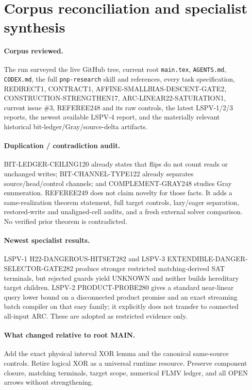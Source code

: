 \documentclass[11pt]{article}
\begin{document}
\section{Corpus reconciliation and specialist synthesis}
\paragraph{Corpus reviewed.}
The run surveyed the live GitHub tree, current root \texttt{main.tex},
\texttt{AGENTS.md}, \texttt{CODEX.md}, the full \texttt{pnp-research} skill and
references, every task specification, REDIRECT1, CONTRACT1,
AFFINE-SMALLBIAS-DESCENT-GATE2, CONSTRUCTION-STRENGTHEN17,
ARC-LINEAR22-SATURATION1, current issue \#3, REFEREE248 and its raw controls,
the latest LSPV-1/2/3 reports, the newest available LSPV-4 report, and the
materially relevant historical bit-ledger/Gray/source-delta artifacts.

\paragraph{Duplication / contradiction audit.}
BIT-LEDGER-CEILING120 already states that flips do not count reads or unchanged
writes; BIT-CHANNEL-TYPE122 already separates source/head/control channels; and
COMPLEMENT-GRAY248 studies Gray enumeration.  REFEREE249 does not claim novelty
for those facts.  It adds a same-realization theorem statement, full target
controls, lazy/eager separation, restored-write and unaligned-cell audits, and
a fresh external solver comparison.  No verified prior theorem is contradicted.

\paragraph{Newest specialist results.}
LSPV-1 H22-DANGEROUS-HITSET282 and LSPV-3
EXTENDIBLE-DANGER-SELECTOR-GATE282 produce stronger restricted
matching-derived SAT terminals, but rejected guards yield UNKNOWN and neither
builds hereditary target children.  LSPV-2 PRODUCT-PROBE280 gives a standard
near-linear query lower bound on a disconnected product promise and an exact
streaming batch compiler on that easy family; it explicitly does not transfer
to connected all-input ARC.  These are adopted as restricted evidence only.

\paragraph{What changed relative to root MAIN.}
Add the exact physical interval XOR lemma and the canonical same-source
controls.  Retire logical XOR as a universal runtime resource.  Preserve
component closure, matching terminals, target scope, numerical FLMV ledger, and
all OPEN arrows without strengthening.
\end{document}
